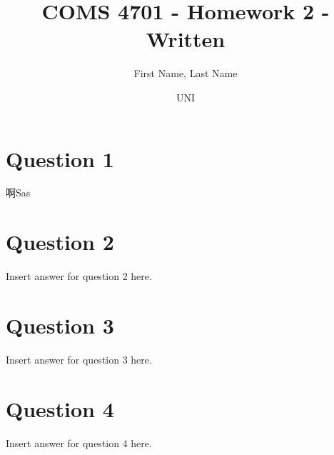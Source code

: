 \documentclass{article}
\title{COMS 4701 - Homework 2 - Written}
\author
{
First Name, Last Name
\and UNI
}
\begin{document}
    \maketitle

    \section*{Question 1}
    啊Sas
    \newpage
    \section*{Question 2}
    Insert answer for question 2 here.
    \newpage
    \section*{Question 3}
    Insert answer for question 3 here.
    \newpage
    \section*{Question 4}
    Insert answer for question 4 here.
\end{document}
